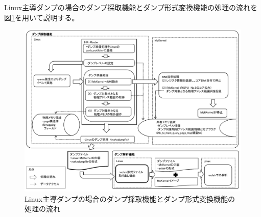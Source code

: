 \documentclass[twoside,11pt,fleqn]{book}
\begin{document}
Linux主導ダンプの場合のダンプ採取機能とダンプ形式変換機能の処理の流れを図\ref{figure:chap01_fig007}を用いて説明する。
\begin{figure}[!ht]
  \includegraphics[scale=0.6]{figs/chap01_fig007.pdf}
  \caption{Linux主導ダンプの場合のダンプ採取機能とダンプ形式変換機能の処理の流れ}
  \label{figure:chap01_fig007}
\end{figure}
\FloatBarrier
%
\end{document}
